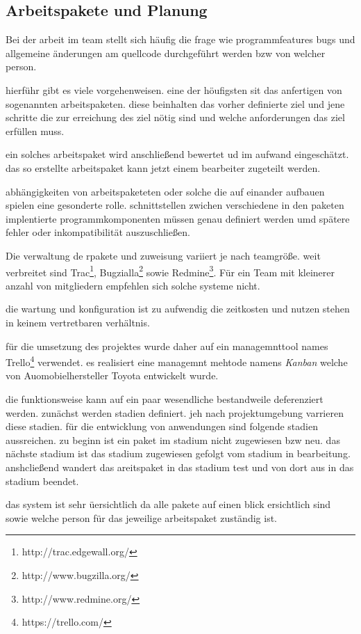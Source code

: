\subsection{Arbeitspakete und Planung}
Bei der arbeit im team stellt sich häufig die frage wie programmfeatures bugs und allgemeine änderungen am quellcode durchgeführt werden bzw von welcher person.

hierführ gibt es viele vorgehenweisen. eine der höufigsten sit das anfertigen von sogenannten arbeitspaketen. diese beinhalten das vorher definierte ziel und jene schritte die zur erreichung des ziel nötig sind und welche anforderungen das ziel erfüllen muss.

ein solches arbeitspaket wird anschließend bewertet ud im aufwand eingeschätzt. das so erstellte arbeitspaket kann jetzt einem bearbeiter zugeteilt werden.

abhängigkeiten von arbeitspaketeten oder solche die auf einander aufbauen spielen eine gesonderte rolle. schnittstellen zwichen verschiedene in den paketen implentierte programmkomponenten müssen genau definiert werden umd spätere fehler oder inkompatibilität auszuschließen.

Die verwaltung de rpakete und zuweisung variiert je nach teamgröße. weit verbreitet sind Trac\footnote{http://trac.edgewall.org/}, Bugzialla\footnote{http://www.bugzilla.org/} sowie Redmine\footnote{http://www.redmine.org/}. Für ein Team mit kleinerer anzahl von mitgliedern empfehlen sich solche systeme nicht.

die wartung und konfiguration ist zu aufwendig die zeitkosten und nutzen stehen in keinem vertretbaren verhältnis.

für die umsetzung des projektes wurde daher auf ein managemnttool names Trello\footnote{https://trello.com/} verwendet. es realisiert eine managemnt mehtode namens \textit{Kanban} welche von Auomobielhersteller Toyota entwickelt wurde.

die funktionsweise kann auf ein paar wesendliche bestandweile deferenziert werden. zunächst werden stadien definiert. jeh nach projektumgebung varrieren diese stadien. für die entwicklung von anwendungen sind folgende stadien aussreichen. zu beginn ist ein paket im stadium nicht zugewiesen bzw neu. das nächste stadium ist das stadium zugewiesen gefolgt vom stadium in bearbeitung. anshcließend wandert das areitspaket in das stadium test und von dort aus in das stadium beendet.

das system ist sehr üersichtlich da alle pakete auf einen blick ersichtlich sind sowie welche person für das jeweilige arbeitspaket zuständig ist.\newpage

